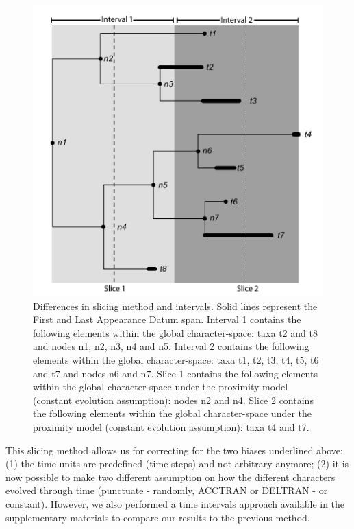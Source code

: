 \documentclass[12pt,letterpaper]{article}
\begin{document}
\begin{figure}[!htbp]
\centering
    \includegraphics[keepaspectratio=true]{Figures/Slicing.pdf}
\caption{Differences in slicing method and intervals. Solid lines represent the First and Last Appearance Datum span. Interval 1 contains the following elements within the global character-space: taxa t2 and t8 and nodes n1, n2, n3, n4 and n5. Interval 2 contains the following elements within the global character-space: taxa t1, t2, t3, t4, t5, t6 and t7 and nodes n6 and n7. Slice 1 contains the following elements within the global character-space under the proximity model (constant evolution assumption): nodes n2 and n4. Slice 2 contains the following elements within the global character-space under the proximity model (constant evolution assumption): taxa t4 and t7.}
\label{fig_slicing}
\end{figure}

This slicing method allows us for correcting for the two biases underlined above: (1) the time units are predefined (time steps) and not arbitrary anymore; (2) it is now possible to make two different assumption on how the different characters evolved through time (punctuate - randomly, ACCTRAN or DELTRAN - or constant). However, we also performed a time intervals approach available in the supplementary materials to compare our results to the previous method.
\end{document}
